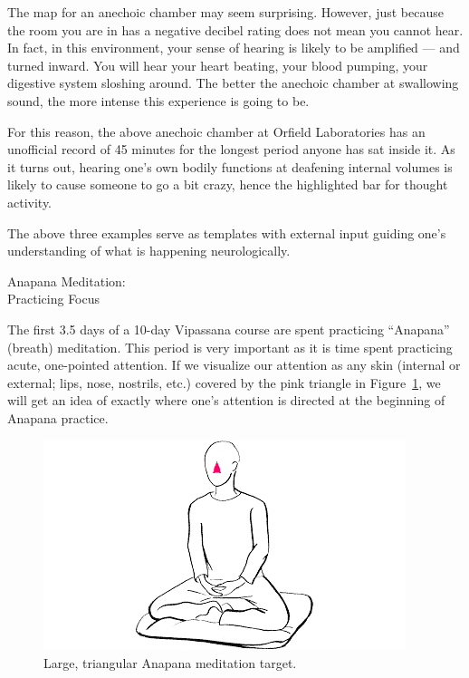 \documentclass{article}
\begin{document}
The map for an anechoic chamber may seem surprising. However, just because the room you are in has a negative decibel rating does not mean you cannot hear. In fact, in this environment, your sense of hearing is likely to be amplified --- and turned inward. You will hear your heart beating, your blood pumping, your digestive system sloshing around. The better the anechoic chamber at swallowing sound, the more intense this experience is going to be.

For this reason, the above anechoic chamber at Orfield Laboratories \cite{orfield} has an unofficial record of 45 minutes for the longest period anyone has sat inside it. As it turns out, hearing one's own bodily functions at deafening internal volumes is likely to cause someone to go a bit crazy, hence the highlighted bar for thought activity.

The above three examples serve as templates with external input guiding one's understanding of what is happening neurologically.


\pagebreak

\begin{center}
  \Huge{Anapana Meditation:}\\
  \Huge{Practicing Focus}
\end{center}

The first 3.5 days of a 10-day Vipassana course are spent practicing ``Anapana'' (breath) meditation. This period is very important as it is time spent practicing acute, one-pointed attention. If we visualize our attention as any skin (internal or external; lips, nose, nostrils, etc.) covered by the pink triangle in Figure~\ref{fig:burmese-anapana-triangle}, we will get an idea of exactly where one's attention is directed at the beginning of Anapana practice.

\begin{figure}[h]
  \centering
  \includegraphics[width=\linewidth]{images/burmese-anapana-triangle.png}
  \caption{Large, triangular Anapana meditation target.}
  \label{fig:burmese-anapana-triangle}
\end{figure}
\end{document}
